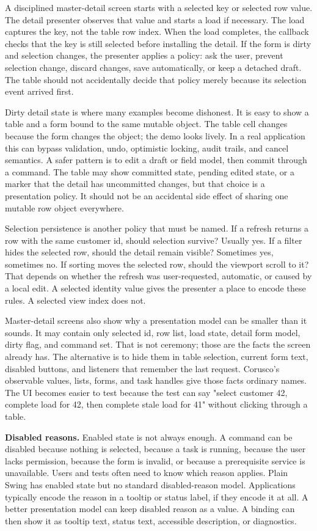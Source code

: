 A disciplined master-detail screen starts with a selected key or selected row value. The detail presenter observes that value and starts a load if necessary. The load captures the key, not the table row index. When the load completes, the callback checks that the key is still selected before installing the detail. If the form is dirty and selection changes, the presenter applies a policy: ask the user, prevent selection change, discard changes, save automatically, or keep a detached draft. The table should not accidentally decide that policy merely because its selection event arrived first.

Dirty detail state is where many examples become dishonest. It is easy to show a table and a form bound to the same mutable object. The table cell changes because the form changes the object; the demo looks lively. In a real application this can bypass validation, undo, optimistic locking, audit trails, and cancel semantics. A safer pattern is to edit a draft or field model, then commit through a command. The table may show committed state, pending edited state, or a marker that the detail has uncommitted changes, but that choice is a presentation policy. It should not be an accidental side effect of sharing one mutable row object everywhere.

Selection persistence is another policy that must be named. If a refresh returns a row with the same customer id, should selection survive? Usually yes. If a filter hides the selected row, should the detail remain visible? Sometimes yes, sometimes no. If sorting moves the selected row, should the viewport scroll to it? That depends on whether the refresh was user-requested, automatic, or caused by a local edit. A selected identity value gives the presenter a place to encode these rules. A selected view index does not.

Master-detail screens also show why a presentation model can be smaller than it sounds. It may contain only selected id, row list, load state, detail form model, dirty flag, and command set. That is not ceremony; those are the facts the screen already has. The alternative is to hide them in table selection, current form text, disabled buttons, and listeners that remember the last request. Corusco's observable values, lists, forms, and task handles give those facts ordinary names. The UI becomes easier to test because the test can say "select customer 42, complete load for 42, then complete stale load for 41" without clicking through a table.

\textbf{Disabled reasons.} Enabled state is not always enough. A command can be disabled because nothing is selected, because a task is running, because the user lacks permission, because the form is invalid, or because a prerequisite service is unavailable. Users and tests often need to know which reason applies. Plain Swing  has enabled state but no standard disabled-reason model. Applications typically encode the reason in a tooltip or status label, if they encode it at all. A better presentation model can keep disabled reason as a value. A binding can then show it as tooltip text, status text, accessible description, or diagnostics.

